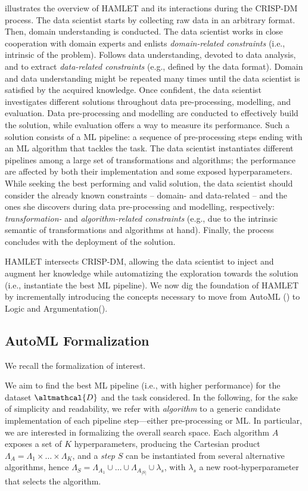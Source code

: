  illustrates the overview of HAMLET and its interactions during the CRISP-DM process.
The data scientist starts by collecting raw data in an arbitrary format.
Then, domain understanding is conducted.
The data scientist works in close cooperation with domain experts and enlists \emph{domain-related constraints} (i.e., intrinsic of the problem).
Follows data understanding, devoted to data analysis, and to extract \emph{data-related constraints} (e.g., defined by the data format).
Domain and data understanding might be repeated many times until the data scientist is satisfied by the acquired knowledge.
Once confident, the data scientist investigates different solutions throughout data pre-processing, modelling, and evaluation.
Data pre-processing and modelling are conducted to effectively build the solution, while evaluation offers a way to measure its performance.
Such a solution consists of a ML pipeline: a sequence of pre-processing steps ending with an ML algorithm that tackles the task.
The data scientist instantiates different pipelines among a large set of transformations and algorithms; the performance are affected by both their implementation and some exposed hyperparameters.
While seeking the best performing and valid solution, the data scientist should consider the already known constraints -- domain- and data-related -- and the ones she discovers during data pre-processing and modelling, respectively: \emph{transformation-} and \emph{algorithm-related constraints} (e.g., due to the intrinsic semantic of transformations and algorithms at hand).
Finally, the process concludes with the deployment of the solution.

HAMLET intersects CRISP-DM, allowing the data scientist to inject and augment her knowledge while automatizing the exploration towards the solution (i.e., instantiate the best ML pipeline).
We now dig the foundation of HAMLET by incrementally introducing the concepts necessary to move from AutoML () to Logic and Argumentation().

\subsection{AutoML Formalization}
\label{hamlet-ssec:automl-formalization}
We recall the formalization of interest.

We aim to find the best ML pipeline (i.e., with higher performance) for the dataset $\altmathcal{D}$ and the task considered.
In the following, for the sake of simplicity and readability, we refer with \textit{algorithm} to a generic candidate implementation of each pipeline step---either pre-processing or ML.
In particular, we are interested in formalizing the overall search space.
Each algorithm $A$ exposes a set of $K$ hyperparameters, producing the Cartesian product $\Lambda_A = \Lambda_1 \times \dots \times \Lambda_K$, and a \textit{step} $S$ can be instantiated from several alternative algorithms, hence $\Lambda_S = \Lambda_{A_1} \cup \ldots \cup \Lambda_{A_{|S|}} \cup \lambda_s$, with $\lambda_s$ a new root-hyperparameter that selects the algorithm.


